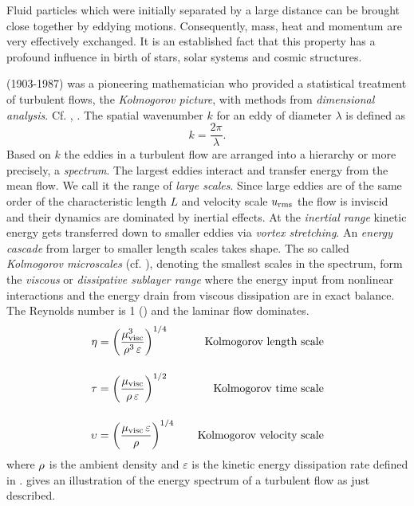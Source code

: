 Fluid particles which were initially separated by a large distance can be
brought close together by eddying motions. Consequently, mass, heat and
momentum are very effectively exchanged. It is an established fact that this
property has a profound influence in birth of stars, solar systems and cosmic
structures.

 (1903-1987) was a pioneering mathematician who provided
a statistical treatment of turbulent flows, the \emph{Kolmogorov picture}, with
methods from \emph{dimensional analysis}. Cf. \cite[p. 33ff]{yoshizawa2013hydrodynamic},
\cite[p. 26ff]{biskamp2003magnetohydrodynamic}.
The spatial wavenumber $k$ for an eddy of diameter $\lambda$ is defined as
\begin{equation}
\label{eqn:wave-number}
    k = \frac{2\pi}{\lambda}.
\end{equation}
Based on $k$ the eddies in a turbulent flow are arranged into a hierarchy or
more precisely, a \emph{spectrum}. The largest eddies interact and transfer
energy from the mean flow.  We call it the range of \emph{large scales}. Since
large eddies are of the same order of the characteristic length $L$ and
velocity scale $u_{\text{rms}}$ the flow is inviscid and their dynamics are dominated by
inertial effects. At the \emph{inertial range} kinetic energy gets transferred
down to smaller eddies via \emph{vortex stretching}. An \emph{energy cascade}
from larger to smaller length scales takes shape. The so called
\emph{Kolmogorov microscales} (cf. \cite{kolmogorov1991dissipation}), denoting the smallest scales in the spectrum,
form the \emph{viscous} or \emph{dissipative sublayer range} where the energy
input from nonlinear interactions and the energy drain from viscous dissipation
are in exact balance. The Reynolds number is 1 () and the
laminar flow dominates.
\begin{align}
\label{eqn:kolmogorov-scales}
    \eta     &= \left(\frac{\mu_{\text{visc}}^3}{\rho^3\,\varepsilon}\right)^{1/4} \;\;\;\; &\text{Kolmogorov length scale} \\[0.4cm]
    \tau     &= \left(\frac{\mu_{\text{visc}}}{\rho\,\varepsilon}\right)^{1/2} \;\;\;\; &\text{Kolmogorov time scale} \\[0.4cm]
    \upsilon &= \left(\frac{\mu_{\text{visc}}\,\varepsilon}{\rho}\right)^{1/4} \;\;\;\; &\text{Kolmogorov velocity scale}
\end{align}
where $\rho$ is the ambient density and $\varepsilon$ is the
kinetic energy dissipation rate defined in .
 gives an illustration of the energy
spectrum of a turbulent flow as just described.

